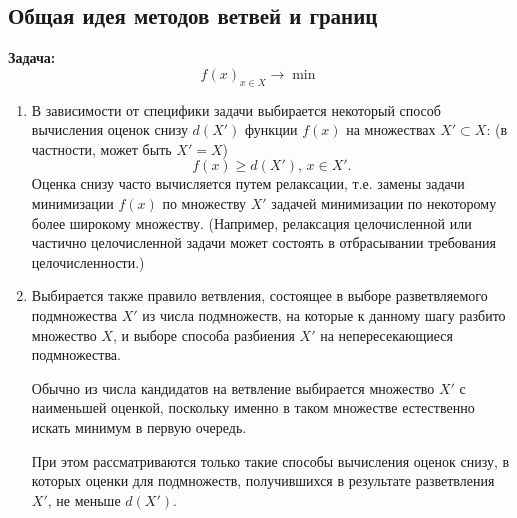 \documentclass[17pt]{extarticle}
\begin{document}
\subsection{Общая идея методов ветвей и границ}
\textbf{Задача:}
\[
    f(x)_{x \in X} \rightarrow \min
\]
\begin{enumerate}
    \item В зависимости от специфики задачи выбирается некоторый способ вычисления оценок
          снизу \( d(X') \) функции \( f(x) \) на множествах \( X' \subset X \):
          (в частности, может быть \( X' = X \))
          \[
              f(x) \geq d(X'), \, x \in X'.
          \]
          Оценка снизу часто вычисляется путем релаксации,
          т.е. замены задачи минимизации \( f(x) \) по множеству \( X' \) задачей минимизации по некоторому более широкому множеству.
          (Например, релаксация целочисленной или частично целочисленной задачи может состоять в отбрасывании требования целочисленности.)

    \item Выбирается также правило ветвления, состоящее в выборе разветвляемого подмножества \( X' \) из числа подмножеств,
          на которые к данному шагу разбито множество \( X \), и выборе способа разбиения \( X' \) на непересекающиеся подмножества.

          Обычно из числа кандидатов на ветвление выбирается множество \( X' \) с наименьшей оценкой,
          поскольку именно в таком множестве естественно искать минимум в первую очередь.

          При этом рассматриваются только такие способы вычисления оценок снизу, в которых оценки для подмножеств,
          получившихся в результате разветвления \( X' \), не меньше \( d(X') \).
\end{enumerate}
\end{document}

